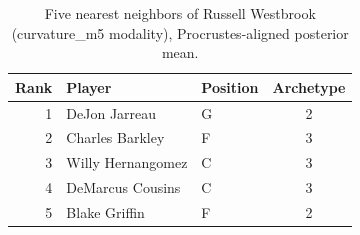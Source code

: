 \begin{table}[htbp]
  \centering\small
  \begin{tabular}{rllc}
    \toprule
    Rank & Player & Position & Archetype \\
    \midrule
    1 & DeJon Jarreau & G & 2 \\
    2 & Charles Barkley & F & 3 \\
    3 & Willy Hernangomez & C & 3 \\
    4 & DeMarcus Cousins & C & 3 \\
    5 & Blake Griffin & F & 2 \\
    \bottomrule
  \end{tabular}
  \caption{Five nearest neighbors of Russell Westbrook (curvature_m5 modality), Procrustes-aligned posterior mean.}
  \label{tab:Russell_Westbrook_neighbors_curvature_m5}
\end{table}

